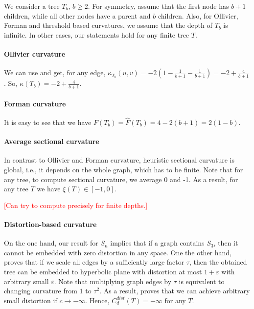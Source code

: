 \documentclass{article} %
\begin{document}
We consider a tree $T_b$, $b \ge 2$. For symmetry, assume that the first node has $b+1$ children, while all other nodes have a parent and $b$ children. Also, for Ollivier, Forman and threshold based curvatures, we assume that the depth of $T_b$ is infinite. In other cases, our statements hold for any finite tree $T$.

\paragraph{Ollivier curvature} We can use  and get, for any edge,
$\kappa_{T_b}(u,v) = -2 \left(1 - \frac{1}{b+1} - \frac{1}{b+1} \right) = - 2 + \frac{4}{b+1}$. So, $\kappa(T_b) = -2 + \frac{4}{b+1}$.

\paragraph{Forman curvature} 
It is easy to see that we have 
$F(T_b) = \hat F(T_b) = 4 - 2(b+1) = 2(1-b)$.


\paragraph{Average sectional curvature} In contrast to Ollivier and Forman curvature, heuristic sectional curvature is global, i.e., it depends on the whole graph, which has to be finite. Note that for any tree, to compute sectional curvature, we average 0 and -1. As a result, for any tree $T$ we have $\xi(T) \in [-1,0]$. 

\textcolor{red}{[Can try to compute precisely for finite depths.]}

\paragraph{Distortion-based curvature} 

On the one hand, our result for $S_n$ implies that if a graph contains $S_3$, then it cannot be embedded with zero distortion in any space. One the other hand, \citet{sarkar2011low} proves that if we scale all edges by a sufficiently large factor $\tau$, then the obtained tree can be embedded to hyperbolic plane with distortion at most $1 + \varepsilon$ with arbitrary small $\varepsilon$. Note that multiplying graph edges by $\tau$ is equivalent to changing curvature from $1$ to $\tau^2$. As a result, \citet{sarkar2011low} proves that we can achieve arbitrary small distortion if $c \to -\infty$.
Hence, $C_d^{dist}(T) = -\infty$ for any $T$.
\end{document}

